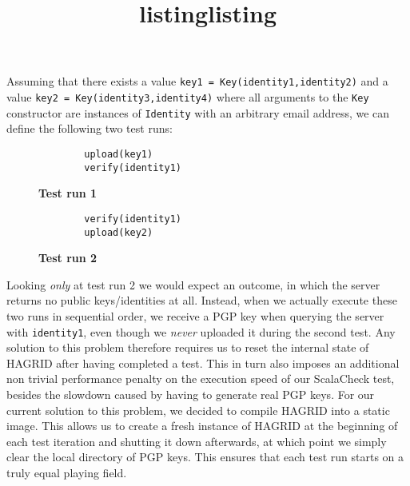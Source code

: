 Assuming that there exists a value \texttt{key1 = Key(identity1,identity2)} and a value \texttt{key2 = Key(identity3,identity4)}
 where all arguments to the \texttt{Key} constructor are instances of \texttt{Identity} with an arbitrary email address, we can define the following two test runs: 
\begin{figure}[!h]
    \begin{minipage}{0.5\textwidth}
        \centering
        \begin{verbatim}
        upload(key1)
        verify(identity1)
        \end{verbatim}
        \title{listing}{\textbf{Test run 1}}
    \end{minipage}
    \begin{minipage}{0.5\textwidth}
        \centering
        \begin{verbatim}
        verify(identity1)
        upload(key2)
        \end{verbatim}
        \title{listing}{\textbf{Test run 2}}
    \end{minipage}
\end{figure}

Looking \emph{only} at test run 2 we would expect an outcome, in which the server returns no public keys/identities at all. Instead, when we actually execute these two runs in sequential order, we receive a PGP key when querying the server with \texttt{identity1}, even though we \emph{never} uploaded it during the second test. 
Any solution to this problem therefore requires us to reset the internal state of HAGRID after having completed a test.
This in turn also imposes an additional non trivial performance penalty on the execution speed of our ScalaCheck test, besides the slowdown caused by having to generate real PGP keys. 
For our current solution to this problem, we decided to compile HAGRID into a static image. This allows us to create a fresh instance of HAGRID at the beginning of each test iteration and shutting it down afterwards, at which point we simply clear the local directory of PGP keys. This ensures that each test run starts on a truly equal playing field.


